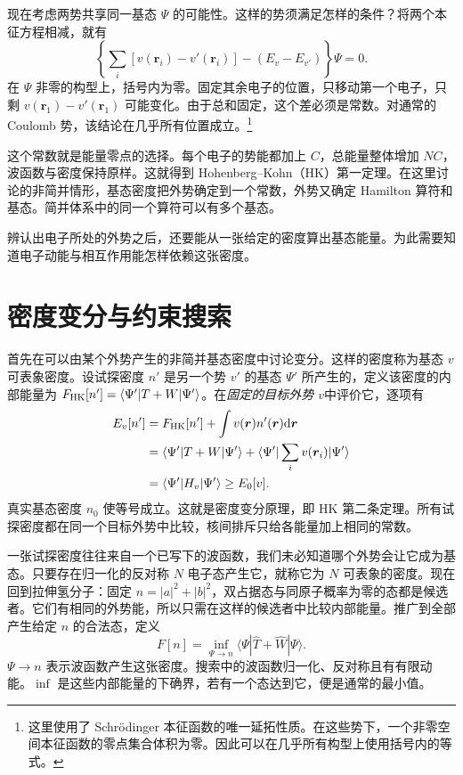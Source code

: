 现在考虑两势共享同一基态 $\Psi$ 的可能性。这样的势须满足怎样的条件？将两个本征方程相减，就有
\begin{equation}
\left\{\sum_i[v(\bm r_i)-v'(\bm r_i)]-(E_v-E_{v'})\right\}\Psi=0.
\end{equation}
在 $\Psi$ 非零的构型上，括号内为零。固定其余电子的位置，只移动第一个电子，只剩 $v(\bm r_1)-v'(\bm r_1)$ 可能变化。由于总和固定，这个差必须是常数。对通常的 Coulomb 势，该结论在几乎所有位置成立。\footnote{这里使用了 Schrödinger 本征函数的唯一延拓性质。在这些势下，一个非零空间本征函数的零点集合体积为零。因此可以在几乎所有构型上使用括号内的等式。}

这个常数就是能量零点的选择。每个电子的势能都加上 $C$，总能量整体增加 $NC$，波函数与密度保持原样。这就得到 Hohenberg--Kohn（HK）第一定理。在这里讨论的非简并情形，基态密度把外势确定到一个常数，外势又确定 Hamilton 算符和基态。简并体系中的同一个算符可以有多个基态。

辨认出电子所处的外势之后，还要能从一张给定的密度算出基态能量。为此需要知道电子动能与相互作用能怎样依赖这张密度。

\section{密度变分与约束搜索}\label{dft:constrained-search}
首先在可以由某个外势产生的非简并基态密度中讨论变分。这样的密度称为基态 $v$ 可表象密度。设试探密度 $n'$ 是另一个势 $v'$ 的基态 $\Psi'$ 所产生的，定义该密度的内部能量为 $F_{\rm HK}[n']=\langle\Psi'|T+W|\Psi'\rangle$。在\emph{固定的目标外势 $v$}中评价它，逐项有
\begin{align}
E_v[n']&=F_{\rm HK}[n']+\int v(\bm r)n'(\bm r)\mathrm{d}\bm r\notag\\
&=\langle\Psi'|T+W|\Psi'\rangle
+\langle\Psi'|\sum_i v(\bm r_i)|\Psi'\rangle\notag\\
&=\langle\Psi'|H_v|\Psi'\rangle\ge E_0[v].
\end{align}
真实基态密度 $n_0$ 使等号成立。这就是密度变分原理，即 HK 第二条定理。所有试探密度都在同一个目标外势中比较，核间排斥只给各能量加上相同的常数。

一张试探密度往往来自一个已写下的波函数，我们未必知道哪个外势会让它成为基态。只要存在归一化的反对称 $N$ 电子态产生它，就称它为 $N$ 可表象的密度。现在回到拉伸氢分子：固定 $n=|a|^2+|b|^2$，双占据态与同原子概率为零的态都是候选者。它们有相同的外势能，所以只需在这样的候选者中比较内部能量。推广到全部产生给定 $n$ 的合法态，定义
\begin{equation}\label{dft:search}
F[n]=\inf_{\Psi\to n}\langle\Psi|\hat T+\hat W|\Psi\rangle.
\end{equation}
$\Psi\to n$ 表示波函数产生这张密度。搜索中的波函数归一化、反对称且有有限动能。$\inf$ 是这些内部能量的下确界，若有一个态达到它，便是通常的最小值。

